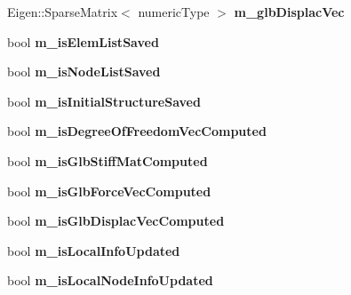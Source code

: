 \begin{DoxyCompactItemize}
\item 
\mbox{\label{classbase_structural_analysis_class_adec181a3818b37d91f185bec9495f7d9}} 
Eigen\+::\+Sparse\+Matrix$<$ numeric\+Type $>$ {\bfseries m\+\_\+glb\+Displac\+Vec}
\item 
\mbox{\label{classbase_structural_analysis_class_a3497fd3dc60eb8cf056a3d3828000bb2}} 
bool {\bfseries m\+\_\+is\+Elem\+List\+Saved}
\item 
\mbox{\label{classbase_structural_analysis_class_a9a89aee1ea437bb8f1a633860b306633}} 
bool {\bfseries m\+\_\+is\+Node\+List\+Saved}
\item 
\mbox{\label{classbase_structural_analysis_class_aeda5815de358a24f99b194854252e94b}} 
bool {\bfseries m\+\_\+is\+Initial\+Structure\+Saved}
\item 
\mbox{\label{classbase_structural_analysis_class_a60baf19b10caa39342408548d5a834ac}} 
bool {\bfseries m\+\_\+is\+Degree\+Of\+Freedom\+Vec\+Computed}
\item 
\mbox{\label{classbase_structural_analysis_class_af6d2f4bea68e4bd857a2ac6bea8194ec}} 
bool {\bfseries m\+\_\+is\+Glb\+Stiff\+Mat\+Computed}
\item 
\mbox{\label{classbase_structural_analysis_class_aaaf8d7f94bb441f267ebbd271216669c}} 
bool {\bfseries m\+\_\+is\+Glb\+Force\+Vec\+Computed}
\item 
\mbox{\label{classbase_structural_analysis_class_a920c4ef5aedc3e9bf397c7d67786e696}} 
bool {\bfseries m\+\_\+is\+Glb\+Displac\+Vec\+Computed}
\item 
\mbox{\label{classbase_structural_analysis_class_ac713f66fa8305712d1b77dd4b2b66b52}} 
bool {\bfseries m\+\_\+is\+Local\+Info\+Updated}
\item 
\mbox{\label{classbase_structural_analysis_class_a5930a49c82de1cc5d03d0b44788f8af0}} 
bool {\bfseries m\+\_\+is\+Local\+Node\+Info\+Updated}
\end{DoxyCompactItemize}


